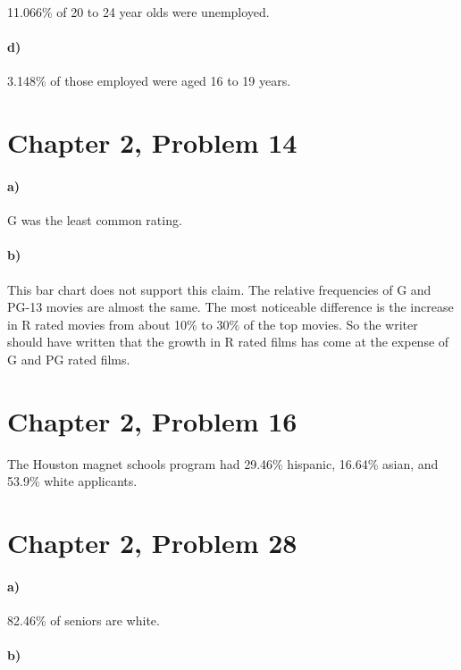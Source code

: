 \documentclass[12pt]{article}
\begin{document}
11.066\% of 20 to 24 year olds were unemployed.

\paragraph{d)}

3.148\% of those employed were aged 16 to 19 years.

\section*{Chapter 2, Problem 14}

\paragraph{a)}

G was the least common rating.

\paragraph{b)}

This bar chart does not support this claim. The relative frequencies of G and PG-13 movies are almost the same. The most
noticeable difference is the increase in R rated movies from about 10\% to 30\% of the top movies. So the writer should
have written that the growth in R rated films has come at the expense of G and PG rated films.

\section*{Chapter 2, Problem 16}

The Houston magnet schools program had 29.46\% hispanic, 16.64\% asian, and 53.9\% white applicants.

\section*{Chapter 2, Problem 28}

\paragraph{a)}

82.46\% of seniors are white.

\paragraph{b)}
\end{document}
